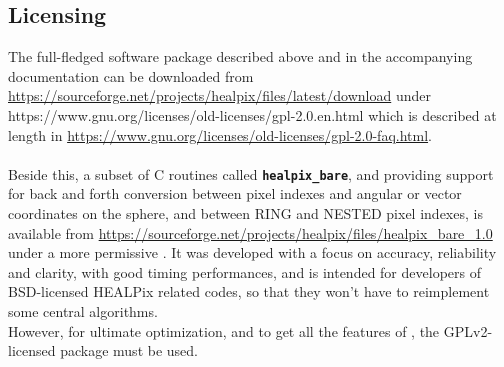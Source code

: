 \documentclass[12pt,twoside]{article}
\begin{document}

\subsection{Licensing}
\label{intro:licensing}
The full-fledged \healpix software package described above and in the accompanying documentation
can be downloaded from  \url{https://sourceforge.net/projects/healpix/files/latest/download} under 
%
{https://www.gnu.org/licenses/old-licenses/gpl-2.0.en.html} which is described at length in  
\url{https://www.gnu.org/licenses/old-licenses/gpl-2.0-faq.html}.\\
\\
Beside this, a subset of C routines called \texttt{\textbf{healpix\_bare}}, and providing support for back and forth conversion between
pixel indexes and angular or vector coordinates on the sphere, 
and between RING and NESTED pixel indexes, is available from 
\url{https://sourceforge.net/projects/healpix/files/healpix_bare_1.0} under a more permissive
.
It was developed with a focus on accuracy, reliability and clarity, with good timing performances, 
and is intended for developers of BSD-licensed HEALPix related codes, so that they won't 
have to reimplement some central algorithms.\\
However, for ultimate optimization, and to get all the features of \healpixns, the GPLv2-licensed
package must be used.

\newpage
\appendix
\end{document}
